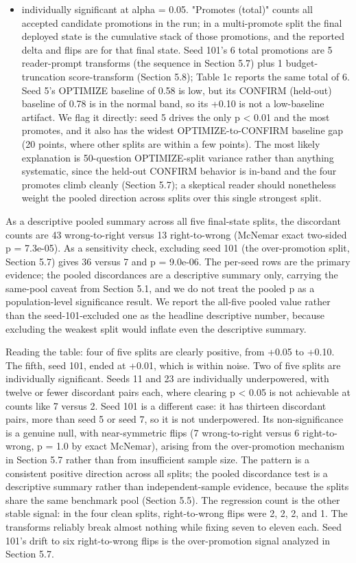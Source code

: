 \begin{itemize}
\item individually significant at alpha = 0.05. "Promotes (total)" counts all accepted candidate promotions in the run; in a multi-promote split the final deployed state is the cumulative stack of those promotions, and the reported delta and flips are for that final state. Seed 101's 6 total promotions are 5 reader-prompt transforms (the sequence in Section 5.7) plus 1 budget-truncation score-transform (Section 5.8); Table 1c reports the same total of 6. Seed 5's OPTIMIZE baseline of 0.58 is low, but its CONFIRM (held-out) baseline of 0.78 is in the normal band, so its +0.10 is not a low-baseline artifact. We flag it directly: seed 5 drives the only p < 0.01 and the most promotes, and it also has the widest OPTIMIZE-to-CONFIRM baseline gap (20 points, where other splits are within a few points). The most likely explanation is 50-question OPTIMIZE-split variance rather than anything systematic, since the held-out CONFIRM behavior is in-band and the four promotes climb cleanly (Section 5.7); a skeptical reader should nonetheless weight the pooled direction across splits over this single strongest split.
\end{itemize}

As a descriptive pooled summary across all five final-state splits, the discordant counts are 43 wrong-to-right versus 13 right-to-wrong (McNemar exact two-sided p = 7.3e-05). As a sensitivity check, excluding seed 101 (the over-promotion split, Section 5.7) gives 36 versus 7 and p = 9.0e-06. The per-seed rows are the primary evidence; the pooled discordances are a descriptive summary only, carrying the same-pool caveat from Section 5.1, and we do not treat the pooled p as a population-level significance result. We report the all-five pooled value rather than the seed-101-excluded one as the headline descriptive number, because excluding the weakest split would inflate even the descriptive summary.

Reading the table: four of five splits are clearly positive, from +0.05 to +0.10. The fifth, seed 101, ended at +0.01, which is within noise. Two of five splits are individually significant. Seeds 11 and 23 are individually underpowered, with twelve or fewer discordant pairs each, where clearing p < 0.05 is not achievable at counts like 7 versus 2. Seed 101 is a different case: it has thirteen discordant pairs, more than seed 5 or seed 7, so it is not underpowered. Its non-significance is a genuine null, with near-symmetric flips (7 wrong-to-right versus 6 right-to-wrong, p = 1.0 by exact McNemar), arising from the over-promotion mechanism in Section 5.7 rather than from insufficient sample size. The pattern is a consistent positive direction across all splits; the pooled discordance test is a descriptive summary rather than independent-sample evidence, because the splits share the same benchmark pool (Section 5.5). The regression count is the other stable signal: in the four clean splits, right-to-wrong flips were 2, 2, 2, and 1. The transforms reliably break almost nothing while fixing seven to eleven each. Seed 101's drift to six right-to-wrong flips is the over-promotion signal analyzed in Section 5.7.

